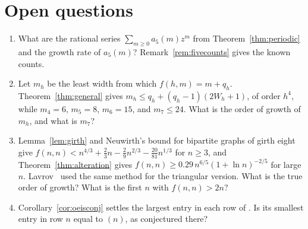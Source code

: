\section{Open questions}\label{sec:open}

\begin{enumerate}[(1),leftmargin=*]
\item What are the rational series $\sum_{m\ge0}a_5(m)z^m$ from
Theorem~\ref{thm:periodic} and the growth rate of $a_5(m)$?
Remark~\ref{rem:fivecounts} gives the known counts.
\item Let $m_h$ be the least width from which $f(h,m)=m+q_h$. Theorem~\ref{thm:general}
gives $m_h\le q_h+(q_h-1)(2W_h+1)$, of order $h^4$, while $m_4=6$, $m_5=8$, $m_6=15$, and
$m_7\le24$. What is the order of growth of $m_h$, and what is $m_7$?
\item Lemma~\ref{lem:girth} and Neuwirth's bound for bipartite graphs of girth
eight~\cite[Corollary~16]{neuwirth2001} give
$f(n,n)<n^{4/3}+\frac23n-\frac29n^{2/3}-\frac{20}{81}n^{1/3}$ for $n\ge3$, and
Theorem~\ref{thm:alteration} gives $f(n,n)\ge0.29\,n^{6/5}(1+\ln n)^{-2/5}$ for large $n$.
Lavrov~\cite{kageyMSE} used the same method for the triangular version. What is the true
order of growth? What is the first $n$ with $f(n,n)>2n$?
\item Corollary~\ref{cor:oeisconj} settles the largest entry in each row of
. Is its smallest entry in row $n$ equal to
$(n)$, as conjectured there?
\end{enumerate}
